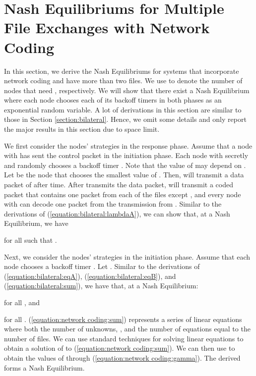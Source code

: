 \documentclass[11pt, conference]{IEEEtran}
\begin{document}
\section{Nash Equilibriums for Multiple File Exchanges with Network Coding} \label{section:network coding}

In this section, we derive the Nash Equilibriums for systems that incorporate network coding and have more than two files. We use  to denote the number of nodes that need , respectively. We will show that there exist a Nash Equilibrium  where each node  chooses each of its backoff timers in both phases as an exponential random variable. A lot of derivations in this section are similar to those in Section \ref{section:bilateral}. Hence, we omit some details and only report the major results in this section due to space limit.

We first consider the nodes' strategies in the response phase. Assume that a node  with  has sent the control packet in the initiation phase. Each node  with  secretly and randomly chooses a backoff timer . Note that the value of  may depend on . Let  be the node that chooses the smallest value of . Then,  will transmit a data packet of  after  time. After  transmits the data packet,  will transmit a coded packet that contains one packet from each of the files except , and every node  with  can decode one packet from the transmission from . Similar to the derivations of (\ref{equation:bilateral:lambdaA}), we can show that, at a Nash Equilibrium, we have

for all  such that .

Next, we consider the nodes' strategies in the initiation phase. Assume that each node  chooses a backoff timer . Let . Similar to the derivations of (\ref{equation:bilateral:eqA}), (\ref{equation:bilateral:eqB}), and (\ref{equation:bilateral:sum}), we have that, at a Nash Equilibrium:

for all , and

for all . (\ref{equation:network coding:sum}) represents a series of linear equations where both the number of unknowns, , and the number of equations equal to the number of files. We can use standard techniques for solving linear equations to obtain a solution of  to (\ref{equation:network coding:sum}). We can then use  to obtain the values of  through (\ref{equation:network coding:gamma}). The derived  forms a Nash Equilibrium.
\end{document}
